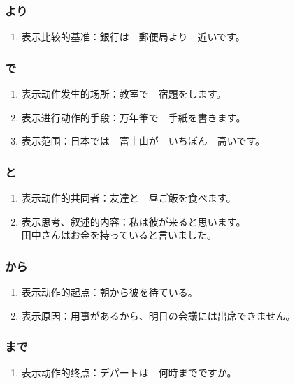 \subsubsection{より}%

\begin{enumerate}
  \item 表示比较的基准：銀行は　郵便局より　近いです。
\end{enumerate}


\subsubsection{で}%

\begin{enumerate}
  \item 表示动作发生的场所：教室で　宿題をします。
  \item 表示进行动作的手段：万年筆で　手紙を書きます。
  \item 表示范围：日本では　富士山が　いちぼん　高いです。
\end{enumerate}


\subsubsection{と}%

\begin{enumerate}
  \item 表示动作的共同者：友達と　昼ご飯を食べます。
  \item 表示思考、叙述的内容：私は彼が来ると思います。\\
    田中さんはお金を持っていると言いました。
\end{enumerate}


\subsubsection{から}%

\begin{enumerate}
  \item 表示动作的起点：朝から彼を待ている。
  \item 表示原因：用事があるから、明日の会議には出席できません。
\end{enumerate}


\subsubsection{まで}%

\begin{enumerate}
  \item 表示动作的终点：デパートは　何時までですか。
\end{enumerate}


